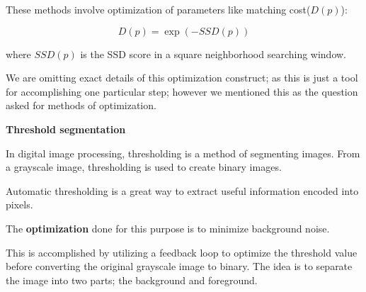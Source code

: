 \documentclass[fleqn, 11pt]{article}
\begin{document}
These methods involve optimization of parameters like matching cost($D(p)$):

$$D(p)=\exp (-SSD(p))$$

where $SSD(p)$ is the SSD score in a square neighborhood searching window.

We are omitting exact details of this optimization construct; as this is just a tool for accomplishing 
one particular step; however we mentioned this as the question asked for methods of optimization. 

\medskip

\textbf{Threshold segmentation}

\smallskip

In digital image processing, thresholding is a method of
segmenting images. From a grayscale image,
thresholding is used to create binary images.

\smallskip

Automatic thresholding is a great way to extract 
useful information encoded into pixels.

\smallskip

The \textbf{optimization} done for this purpose is to minimize
background noise. 

\smallskip

This is accomplished by utilizing a feedback loop to optimize the threshold value before converting the original grayscale image to binary. 
The idea is to separate the image into two parts; the background and foreground.
\end{document}
